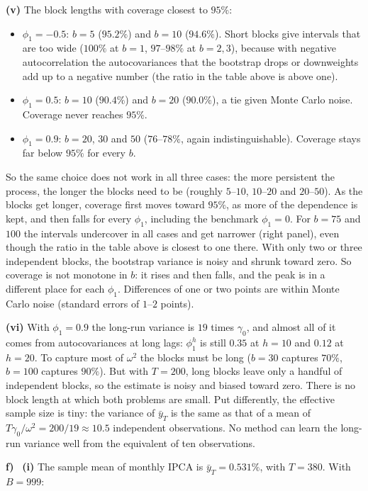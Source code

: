 \documentclass[11pt]{article}
\newcounter{problem}
\newcommand{\itm}[1]{\par\textbf{#1)}\ }
\begin{document}
\textbf{(v)} The block lengths with coverage closest to $95\%$:
\begin{itemize}
	\item $\phi_1=-0.5$: $b=5$ ($95.2\%$) and $b=10$ ($94.6\%$). Short blocks give intervals that are too wide ($100\%$ at $b=1$, $97$--$98\%$ at $b=2,3$), because with negative autocorrelation the autocovariances that the bootstrap drops or downweights add up to a negative number (the ratio in the table above is above one).
	\item $\phi_1=0.5$: $b=10$ ($90.4\%$) and $b=20$ ($90.0\%$), a tie given Monte Carlo noise. Coverage never reaches $95\%$.
	\item $\phi_1=0.9$: $b=20$, $30$ and $50$ ($76$--$78\%$, again indistinguishable). Coverage stays far below $95\%$ for every $b$.
\end{itemize}
So the same choice does not work in all three cases: the more persistent the process, the longer the blocks need to be (roughly $5$--$10$, $10$--$20$ and $20$--$50$). As the blocks get longer, coverage first moves toward $95\%$, as more of the dependence is kept, and then falls for every $\phi_1$, including the benchmark $\phi_1=0$. For $b=75$ and $100$ the intervals undercover in all cases and get narrower (right panel), even though the ratio in the table above is closest to one there. With only two or three independent blocks, the bootstrap variance is noisy and shrunk toward zero. So coverage is not monotone in $b$: it rises and then falls, and the peak is in a different place for each $\phi_1$. Differences of one or two points are within Monte Carlo noise (standard errors of $1$--$2$ points).

\textbf{(vi)} With $\phi_1=0.9$ the long-run variance is $19$ times $\gamma_0$, and almost all of it comes from autocovariances at long lags: $\phi_1^h$ is still $0.35$ at $h=10$ and $0.12$ at $h=20$. To capture most of $\omega^2$ the blocks must be long ($b=30$ captures $70\%$, $b=100$ captures $90\%$). But with $T=200$, long blocks leave only a handful of independent blocks, so the estimate is noisy and biased toward zero. There is no block length at which both problems are small. Put differently, the effective sample size is tiny: the variance of $\bar y_T$ is the same as that of a mean of $T\gamma_0/\omega^2 = 200/19\approx 10.5$ independent observations. No method can learn the long-run variance well from the equivalent of ten observations.

\itm{f}
\textbf{(i)} The sample mean of monthly IPCA is $\bar y_T=0.531\%$, with $T=380$. With $B=999$:
\end{document}
